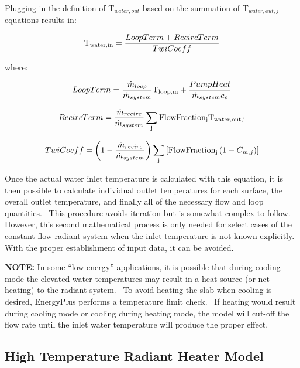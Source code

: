 {Plugging in the definition of T\(_{water,out}\) based on the summation of T\(_{water,out,j}\) equations results in:

\begin{equation}
{{\rm{T}}_{{\rm{water,in}}}} = \frac{{LoopTerm + RecircTerm}}{{TwiCoeff}}
\end{equation}

where:

\begin{equation}
LoopTerm = \frac{{{{\dot m}_{loop}}}}{{{{\dot m}_{system}}}}{{\rm{T}}_{{\rm{loop,in}}}} + \frac{{PumpHeat}}{{{{\dot m}_{system}}{c_p}}}
\end{equation}

\begin{equation}
RecircTerm = \frac{{{{\dot m}_{recirc}}}}{{{{\dot m}_{system}}}}\sum\limits_{\rm{j}} {{\rm{FlowFractio}}{{\rm{n}}_{\rm{j}}}{{\rm{T}}_{{\rm{water,out,j}}}}}
\end{equation}

\begin{equation}
TwiCoeff = \left( {1 - \frac{{{{\dot m}_{recirc}}}}{{{{\dot m}_{system}}}}} \right)\sum\limits_{\rm{j}} {\left[ {{\rm{FlowFractio}}{{\rm{n}}_{\rm{j}}}\left( {1 - {C_{m,j}}} \right)} \right]}
\end{equation}

Once the actual water inlet temperature is calculated with this equation, it is then possible to calculate individual outlet temperatures for each surface, the overall outlet temperature, and finally all of the necessary flow and loop quantities.~ This procedure avoids iteration but is somewhat complex to follow.~ However, this second mathematical process is only needed for select cases of the constant flow radiant system when the inlet temperature is not known explicitly.~ With the proper establishment of input data, it can be avoided.

\textbf{NOTE:} In some ``low-energy'' applications, it is possible that during cooling mode the elevated water temperatures may result in a heat source (or net heating) to the radiant system.~ To avoid heating the slab when cooling is desired, EnergyPlus performs a temperature limit check.~ If heating would result during cooling mode or cooling during heating mode, the model will cut-off the flow rate until the inlet water temperature will produce the proper effect.

\subsection{High Temperature Radiant Heater Model}\label{high-temperature-radiant-heater-model}

}
